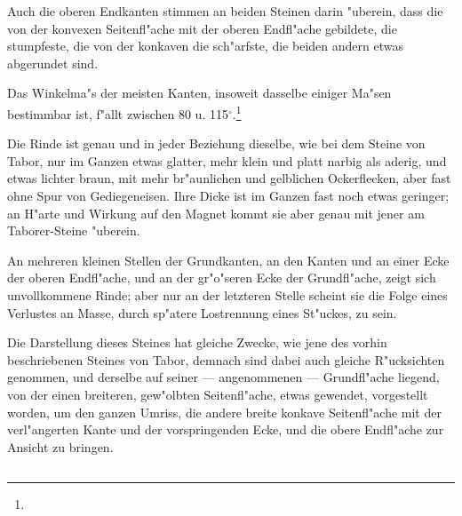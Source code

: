 \documentclass[a4paper, 11pt, oneside, german]{article}
\begin{document}
Auch die oberen Endkanten stimmen an beiden Steinen darin "uberein, dass die von der konvexen Seitenfl"ache mit der oberen Endfl"ache gebildete, die stumpfeste, die von der konkaven die sch"arfste, die beiden andern etwas abgerundet sind.

Das Winkelma"s der meisten Kanten, insoweit dasselbe einiger Ma"sen bestimmbar ist, f"allt zwischen 80 u. 115$^{\circ}$.\footnote{}

Die Rinde ist genau und in jeder Beziehung dieselbe, wie bei dem Steine von Tabor, nur im Ganzen etwas glatter, mehr klein und platt narbig als aderig, und etwas lichter braun, mit mehr br"aunlichen und gelblichen Ockerflecken, aber fast ohne Spur von Gediegeneisen. Ihre Dicke ist im Ganzen fast noch etwas geringer; an H"arte und Wirkung auf den Magnet kommt sie aber genau mit jener am Taborer-Steine "uberein.

An mehreren kleinen Stellen der Grundkanten, an den Kanten und an einer Ecke der oberen Endfl"ache, und an der gr"o"seren Ecke der Grundfl"ache, zeigt sich unvollkommene Rinde; aber nur an der letzteren Stelle scheint sie die Folge eines Verlustes an Masse, durch sp"atere Lostrennung eines St"uckes, zu sein.

Die Darstellung dieses Steines hat gleiche Zwecke, wie jene des vorhin beschriebenen Steines von Tabor, demnach sind dabei auch gleiche R"ucksichten genommen, und derselbe auf seiner --- angenommenen --- Grundfl"ache liegend, von der einen breiteren, gew"olbten Seitenfl"ache, etwas gewendet, vorgestellt worden, um den ganzen Umriss, die andere breite konkave Seitenfl"ache mit der verl"angerten Kante und der vorspringenden Ecke, und die obere Endfl"ache zur Ansicht zu bringen.

\subsection{}
\end{document}
